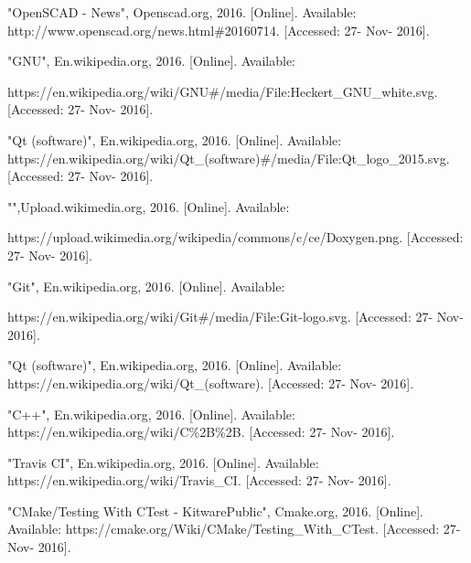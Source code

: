 \begin{thebibliography}{22}
\bibitem{} "OpenSCAD - News", Openscad.org, 2016. [Online]. Available: http://www.openscad.org/news.html\#20160714. [Accessed: 27- Nov- 2016].

\bibitem{} "GNU", En.wikipedia.org, 2016. [Online]. Available: 

https://en.wikipedia.org/wiki/GNU\#/media/File:Heckert\_GNU\_white.svg. [Accessed: 27- Nov- 2016].

\bibitem{} "Qt (software)", En.wikipedia.org, 2016. [Online]. Available: https://en.wikipedia.org/wiki/Qt\_(software)\#/media/File:Qt\_logo\_2015.svg. [Accessed: 27- Nov- 2016].


\bibitem{} "",Upload.wikimedia.org, 2016. [Online]. Available: 

https://upload.wikimedia.org/wikipedia/commons/c/ce/Doxygen.png. [Accessed: 27- Nov- 2016].


\bibitem{} "Git", En.wikipedia.org, 2016. [Online]. Available: 

https://en.wikipedia.org/wiki/Git\#/media/File:Git-logo.svg. [Accessed: 27- Nov- 2016].


\bibitem{}"Qt (software)", En.wikipedia.org, 2016. [Online]. Available: https://en.wikipedia.org/wiki/Qt\_(software). [Accessed: 27- Nov- 2016].

\bibitem{} "C++", En.wikipedia.org, 2016. [Online]. Available: https://en.wikipedia.org/wiki/C\%2B\%2B. [Accessed: 27- Nov- 2016].

\bibitem{}"Travis CI", En.wikipedia.org, 2016. [Online]. Available: https://en.wikipedia.org/wiki/Travis\_CI. [Accessed: 27- Nov- 2016].

\bibitem{} "CMake/Testing With CTest - KitwarePublic", Cmake.org, 2016. [Online]. Available: https://cmake.org/Wiki/CMake/Testing\_With\_CTest. [Accessed: 27- Nov- 2016].

\end{thebibliography}
